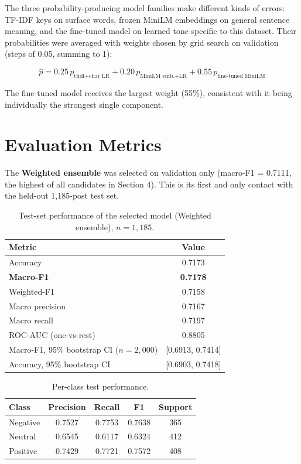 \documentclass[11pt,a4paper]{article}
\begin{document}
The three probability-producing model families make different kinds of errors: TF-IDF keys on surface words, frozen MiniLM embeddings on general sentence meaning, and the fine-tuned model on learned tone specific to this dataset. Their probabilities were averaged with weights chosen by grid search on validation (steps of 0.05, summing to 1):

\[
\hat{p} = 0.25\,p_{\text{tfidf+char LR}} + 0.20\,p_{\text{MiniLM emb.+LR}} + 0.55\,p_{\text{fine-tuned MiniLM}}
\]

The fine-tuned model receives the largest weight (55\%), consistent with it being individually the strongest single component.

\section{Evaluation Metrics}
\label{sec:evaluation}

The \textbf{Weighted ensemble} was selected on validation only (macro-F1 = 0.7111, the highest of all candidates in Section 4). This is its first and only contact with the held-out 1{,}185-post test set.

\begin{table}[H]
\centering
\begin{tabular}{@{}lc@{}}
\toprule
\textbf{Metric} & \textbf{Value} \\
\midrule
Accuracy & 0.7173 \\
\textbf{Macro-F1} & \textbf{0.7178} \\
Weighted-F1 & 0.7158 \\
Macro precision & 0.7167 \\
Macro recall & 0.7197 \\
ROC-AUC (one-vs-rest) & 0.8805 \\
Macro-F1, 95\% bootstrap CI ($n=2{,}000$) & [0.6913, 0.7414] \\
Accuracy, 95\% bootstrap CI & [0.6903, 0.7418] \\
\bottomrule
\end{tabular}
\caption{Test-set performance of the selected model (Weighted ensemble), $n=1{,}185$.}
\end{table}

\begin{table}[H]
\centering
\begin{tabular}{@{}lcccc@{}}
\toprule
\textbf{Class} & \textbf{Precision} & \textbf{Recall} & \textbf{F1} & \textbf{Support} \\
\midrule
Negative & 0.7527 & 0.7753 & 0.7638 & 365 \\
Neutral & 0.6545 & 0.6117 & 0.6324 & 412 \\
Positive & 0.7429 & 0.7721 & 0.7572 & 408 \\
\bottomrule
\end{tabular}
\caption{Per-class test performance.}
\end{table}
\end{document}
